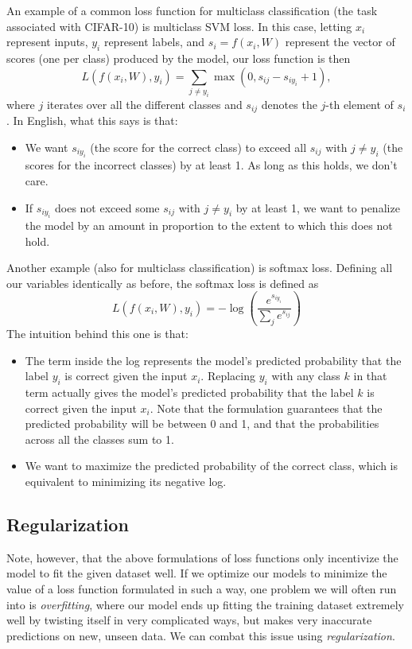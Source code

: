 An example of a common loss function for multiclass classification (the task associated with CIFAR-10) is multiclass SVM loss. In this case, letting $x_i$ represent inputs, $y_i$ represent labels, and $s_i = f(x_i, W)$ represent the vector of scores (one per class) produced by the model, our loss function is then
$$L\left(f\left(x_i, W\right), y_i\right) = \sum_{j \ne y_i} \max\left(0, s_{ij} - s_{iy_i} + 1\right),$$
where $j$ iterates over all the different classes and $s_{ij}$ denotes the $j$-th element of $s_i$. In English, what this says is that:
\begin{itemize}
\item We want $s_{iy_i}$ (the score for the correct class) to exceed all $s_{ij}$ with $j\ne y_i$ (the scores for the incorrect classes) by at least 1. As long as this holds, we don't care.
\item If $s_{iy_i}$ does not exceed some $s_{ij}$ with $j\ne y_i$ by at least 1, we want to penalize the model by an amount in proportion to the extent to which this does not hold.
\end{itemize}
Another example (also for multiclass classification) is softmax loss. Defining all our variables identically as before, the softmax loss is defined as
$$L\left(f\left(x_i, W\right), y_i\right) = -\log\left(\frac{e^{s_{iy_i}}}{\sum_j e^{s_{ij}}}\right)$$
The intuition behind this one is that:
\begin{itemize}
\item The term inside the log represents the model's predicted probability that the label $y_i$ is correct given the input $x_i$. Replacing $y_i$ with any class $k$ in that term actually gives the model's predicted probability that the label $k$ is correct given the input $x_i$. Note that the formulation guarantees that the predicted probability will be between 0 and 1, and that the probabilities across all the classes sum to 1.
\item We want to maximize the predicted probability of the correct class, which is equivalent to minimizing its negative log.
\end{itemize}

\subsection{Regularization}
Note, however, that the above formulations of loss functions only incentivize the model to fit the given dataset well. If we optimize our models to minimize the value of a loss function formulated in such a way, one problem we will often run into is \emph{overfitting}, where our model ends up fitting the training dataset extremely well by twisting itself in very complicated ways, but makes very inaccurate predictions on new, unseen data. We can combat this issue using \emph{regularization}.

